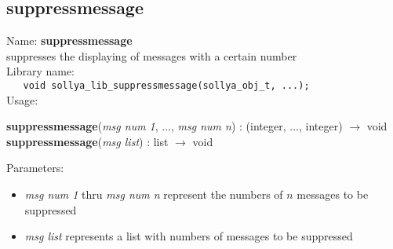 \subsection{suppressmessage}
\label{labsuppressmessage}
\noindent Name: \textbf{suppressmessage}\\
\phantom{aaa}suppresses the displaying of messages with a certain number\\[0.2cm]
\noindent Library name:\\
\verb|   void sollya_lib_suppressmessage(sollya_obj_t, ...);|\\[0.2cm]
\noindent Usage: 
\begin{center}
\textbf{suppressmessage}(\emph{msg num 1}, ..., \emph{msg num n})   : (\textsf{integer}, ..., \textsf{integer}) $\rightarrow$ \textsf{void}\\
\textbf{suppressmessage}(\emph{msg list})   : \textsf{list} $\rightarrow$ \textsf{void}\\
\end{center}
Parameters: 
\begin{itemize}
\item \emph{msg num 1} thru \emph{msg num n} represent the numbers of $n$ messages to be suppressed
\item \emph{msg list} represents a list with numbers of messages to be suppressed
\end{itemize}
